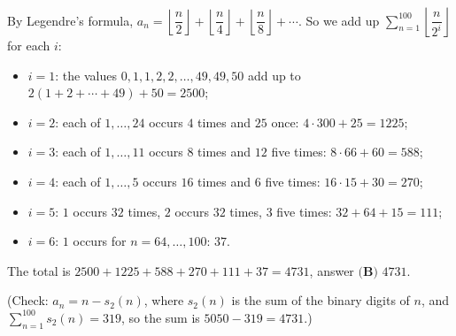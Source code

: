 By Legendre's formula, $a_n=\left\lfloor\dfrac {n}{2}\right\rfloor+\left\lfloor\dfrac {n}{4}\right\rfloor+\left\lfloor\dfrac {n}{8}\right\rfloor+\cdots$. So we add up $\displaystyle\sum_{n=1}^{100}\left\lfloor\dfrac{n}{2^i}\right\rfloor$ for each $i$:
\begin{itemize}
\item $i=1$: the values $0,1,1,2,2,\ldots,49,49,50$ add up to $2(1+2+\cdots+49)+50=2500$;
\item $i=2$: each of $1,\ldots,24$ occurs $4$ times and $25$ once: $4\cdot300+25=1225$;
\item $i=3$: each of $1,\ldots,11$ occurs $8$ times and $12$ five times: $8\cdot66+60=588$;
\item $i=4$: each of $1,\ldots,5$ occurs $16$ times and $6$ five times: $16\cdot15+30=270$;
\item $i=5$: $1$ occurs $32$ times, $2$ occurs $32$ times, $3$ five times: $32+64+15=111$;
\item $i=6$: $1$ occurs for $n=64,\ldots,100$: $37$.
\end{itemize}
The total is $2500+1225+588+270+111+37=4731$, answer $\boxed{\textbf{(B) } 4731}$.

(Check: $a_n=n-s_2(n)$, where $s_2(n)$ is the sum of the binary digits of $n$, and $\displaystyle\sum_{n=1}^{100}s_2(n)=319$, so the sum is $5050-319=4731$.)
